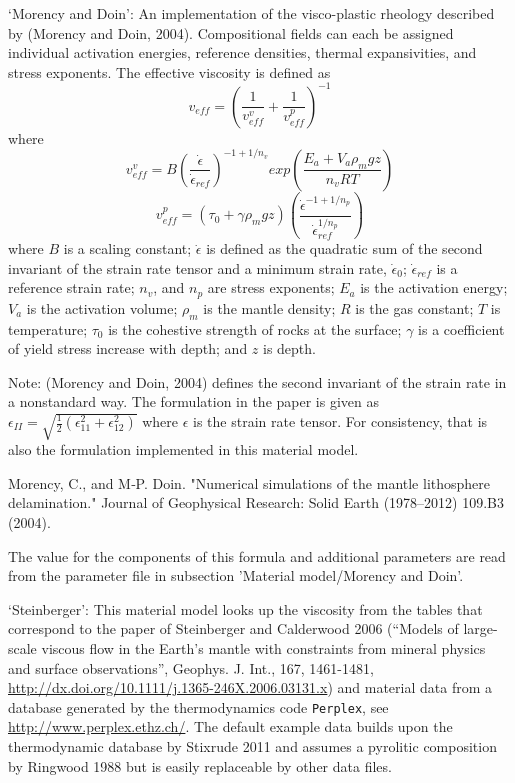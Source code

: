 \begin{itemize}
`Morency and Doin': An implementation of the visco-plastic rheology described by (Morency and Doin, 2004). Compositional fields can each be assigned individual activation energies, reference densities, thermal expansivities, and stress exponents. The effective viscosity is defined as \[v_{eff} = \left(\frac{1}{v_{eff}^v}+\frac{1}{v_{eff}^p}\right)^{-1}\] where \[v_{eff}^v = B \left(\frac{\dot{\epsilon}}{\dot{\epsilon}_{ref}} \right)^{-1+1/n_v} exp\left(\frac{E_a +V_a \rho_m g z}{n_v R T}\right) \] \[v_{eff}^p = (\tau_0 + \gamma \rho_m g z) \left( \frac{\dot{\epsilon}^{-1+1/n_p}} {\dot{\epsilon}_{ref}^{1/n_p}} \right) \] where $B$ is a scaling constant; $\dot{\epsilon}$ is defined as the quadratic sum of the second invariant of the strain rate tensor and a minimum strain rate, $\dot{\epsilon}_0$; $\dot{\epsilon}_{ref}$ is a reference strain rate; $n_v$, and $n_p$ are stress exponents; $E_a$ is the activation energy; $V_a$ is the activation volume; $\rho_m$ is the mantle density; $R$ is the gas constant; $T$ is temperature; $\tau_0$ is the cohestive strength of rocks at the surface; $\gamma$ is a coefficient of yield stress increase with depth; and $z$ is depth. 

 Note: (Morency and Doin, 2004) defines the second invariant of the strain rate in a nonstandard way. The formulation in the paper is given as $\epsilon_{II} = \sqrt{\frac{1}{2} (\epsilon_{11}^2 + \epsilon_{12}^2)}$ where $\epsilon$ is the strain rate tensor. For consistency, that is also the formulation implemented in this material model. 

 Morency, C., and M‐P. Doin. "Numerical simulations of the mantle lithosphere delamination." Journal of Geophysical Research: Solid Earth (1978–2012) 109.B3 (2004). 

 The value for the components of this formula and additional parameters are read from the parameter file in subsection 'Material model/Morency and Doin'.

`Steinberger': This material model looks up the viscosity from the tables that correspond to the paper of Steinberger and Calderwood 2006 (``Models of large-scale viscous flow in the Earth's mantle with constraints from mineral physics and surface observations'', Geophys. J. Int., 167, 1461-1481, \url{http://dx.doi.org/10.1111/j.1365-246X.2006.03131.x}) and material data from a database generated by the thermodynamics code \texttt{Perplex}, see \url{http://www.perplex.ethz.ch/}. The default example data builds upon the thermodynamic database by Stixrude 2011 and assumes a pyrolitic composition by Ringwood 1988 but is easily replaceable by other data files. 


\end{itemize}
